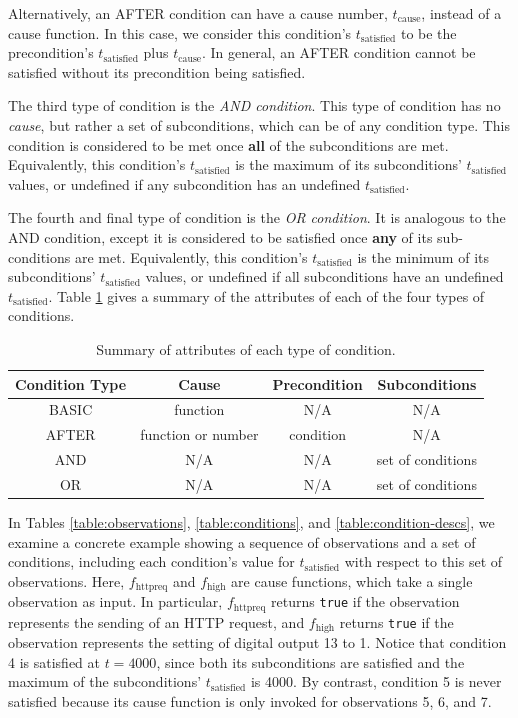 \documentclass[12pt]{article}
\begin{document}
Alternatively, an AFTER condition can have a cause number, $t_{\text{cause}}$, instead of a cause function.  In this case, we consider this condition's $t_{\text{satisfied}}$ to be the precondition's $t_{\text{satisfied}}$ plus $t_{\text{cause}}$.  In general, an AFTER condition cannot be satisfied without its precondition being satisfied.

The third type of condition is the \textit{AND condition}.  This type of condition has no \textit{cause}, but rather a set of subconditions, which can be of any condition type.  This condition is considered to be met once \textbf{all} of the subconditions are met.  Equivalently, this condition's $t_{\text{satisfied}}$ is the maximum of its subconditions' $t_{\text{satisfied}}$ values, or undefined if any subcondition has an undefined $t_{\text{satisfied}}$.

The fourth and final type of condition is the \textit{OR condition}.  It is analogous to the AND condition, except it is considered to be satisfied once \textbf{any} of its sub-conditions are met. Equivalently, this condition's $t_{\text{satisfied}}$ is the minimum of its subconditions' $t_{\text{satisfied}}$ values, or undefined if all subconditions have an undefined $t_{\text{satisfied}}$.  Table \ref{table:condition-summary} gives a summary of the attributes of each of the four types of conditions.

\begin{table}[ht]
\begin{center}
\begin{tabular}{cccc}
Condition Type & Cause & Precondition & Subconditions \\ \hline
BASIC & function & N/A & N/A \\
AFTER & function or number & condition & N/A \\
AND & N/A & N/A & set of conditions \\
OR & N/A & N/A & set of conditions \\ \hline
\end{tabular}
\caption{Summary of attributes of each type of condition.}
\label{table:condition-summary}
\end{center}
\end{table}

In Tables \ref{table:observations}, \ref{table:conditions}, and \ref{table:condition-descs}, we examine a concrete example showing a sequence of observations and a set of conditions, including each condition's value for $t_{\text{satisfied}}$ with respect to this set of observations.  Here, $f_{\text{httpreq}}$ and $f_{\text{high}}$ are cause functions, which take a single observation as input.  In particular, $f_{\text{httpreq}}$ returns \texttt{true} if the observation represents the sending of an HTTP request, and $f_{\text{high}}$ returns \texttt{true} if the observation represents the setting of digital output 13 to 1.  Notice that condition 4 is satisfied at $t=4000$, since both its subconditions are satisfied and the maximum of the subconditions' $t_{\text{satisfied}}$ is 4000.  By contrast, condition 5 is never satisfied because its cause function is only invoked for observations 5, 6, and 7.
\end{document}
